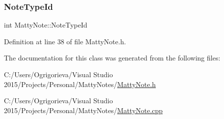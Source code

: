 \subsubsection{\texorpdfstring{Note\+Type\+Id}{NoteTypeId}}
{\footnotesize\ttfamily int Matty\+Note\+::\+Note\+Type\+Id\hspace{0.3cm}{\ttfamily [private]}}



Definition at line 38 of file Matty\+Note.\+h.



The documentation for this class was generated from the following files\+:\begin{DoxyCompactItemize}
\item 
C\+:/\+Users/\+Ogrigorieva/\+Visual Studio 2015/\+Projects/\+Personal/\+Matty\+Notes/\hyperlink{MattyNote_8h}{Matty\+Note.\+h}\item 
C\+:/\+Users/\+Ogrigorieva/\+Visual Studio 2015/\+Projects/\+Personal/\+Matty\+Notes/\hyperlink{MattyNote_8cpp}{Matty\+Note.\+cpp}\end{DoxyCompactItemize}
